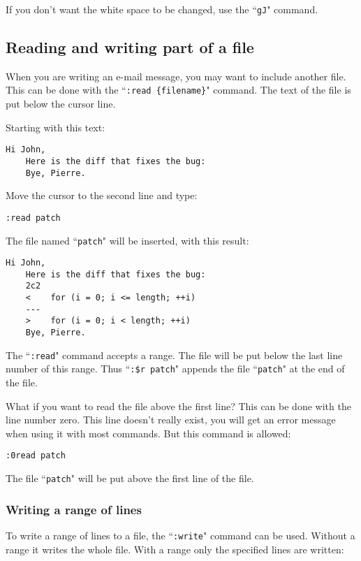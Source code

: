 If you don't want the white space to be changed, use the ``\texttt{gJ}" command.
\subsection{Reading and writing part of a file}
When you are writing an e-mail message, you may want to include another file.
This can be done with the ``\texttt{:read \{filename\}}" command.
The text of the file is put below the cursor line.

Starting with this text:

\begin{Verbatim}[samepage=true]
    Hi John,
    Here is the diff that fixes the bug:
    Bye, Pierre.
\end{Verbatim}

Move the cursor to the second line and type:

\begin{Verbatim}[samepage=true]
 :read patch
\end{Verbatim}

The file named ``\texttt{patch}" will be inserted, with this result:

\begin{Verbatim}[samepage=true]
    Hi John,
    Here is the diff that fixes the bug:
    2c2
    <    for (i = 0; i <= length; ++i)
    ---
    >    for (i = 0; i < length; ++i)
    Bye, Pierre.
\end{Verbatim}

The ``\texttt{:read}" command accepts a range.
The file will be put below the last line number of this range.
Thus ``\texttt{:\$r patch}" appends the file ``\texttt{patch}" at the end of the file.

What if you want to read the file above the first line?  This can be done with the line number zero.
This line doesn't really exist, you will get an error message when using it with most commands.
But this command is allowed:

\begin{Verbatim}[samepage=true]
 :0read patch
\end{Verbatim}

The file ``\texttt{patch}" will be put above the first line of the file.
\subsubsection{Writing a range of lines}
To write a range of lines to a file, the ``\texttt{:write}" command can be used.
Without a range it writes the whole file.
With a range only the specified lines are written:

